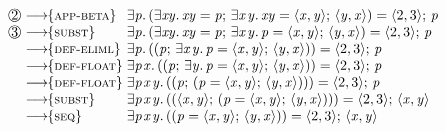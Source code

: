 \documentclass[acmsmall,review,dvipsnames]{acmart}
\newcommand{\Varid}[1]{\mathit{#1}}
\newcommand{\rulename}[1]{\textsc{\small #1}}
\newcommand{\movesto}{\longrightarrow}
\newcommand{\movestoC}[1]{\movesto\!\!\{#1\}}
\newcommand{\movestoR}[1]{\movestoC{\rulename{#1}}}
\begin{document}
\begin{figure}
\begin{scriptsize}
$$\begin{array}{@{}l@{\;}l@{\;}l@{}}
\circlednum{2} & \movestoR{app-beta}       & \ensuremath{\exists\Varid{p}.\,(\exists\Varid{xy}.\,\Varid{xy}\mathrel{=}\Varid{p};\,\exists\Varid{x}\hspace{0.3mm}\Varid{y}.\,\Varid{xy}\mathrel{=}\langle{}\Varid{x},\Varid{y}\rangle;\,\langle{}\Varid{y},\Varid{x}\rangle)\mathrel{=}\langle{}\mathrm{2},\mathrm{3}\rangle;\,\Varid{p}} \\
\circlednum{3} & \movestoR{subst}          & \ensuremath{\exists\Varid{p}.\,(\exists\Varid{xy}.\,\Varid{xy}\mathrel{=}\Varid{p};\,\exists\Varid{x}\hspace{0.3mm}\Varid{y}.\,\Varid{p}\mathrel{=}\langle{}\Varid{x},\Varid{y}\rangle;\,\langle{}\Varid{y},\Varid{x}\rangle)\mathrel{=}\langle{}\mathrm{2},\mathrm{3}\rangle;\,\Varid{p}} \\
               & \movestoR{def-eliml}      & \ensuremath{\exists\Varid{p}.\,((\Varid{p};\,\exists\Varid{x}\hspace{0.3mm}\Varid{y}.\,\Varid{p}\mathrel{=}\langle{}\Varid{x},\Varid{y}\rangle;\,\langle{}\Varid{y},\Varid{x}\rangle))\mathrel{=}\langle{}\mathrm{2},\mathrm{3}\rangle;\,\Varid{p}} \\
               & \movestoR{def-float}      & \ensuremath{\exists\Varid{p}\hspace{0.3mm}\Varid{x}.\,((\Varid{p};\,\exists\Varid{y}.\,\Varid{p}\mathrel{=}\langle{}\Varid{x},\Varid{y}\rangle;\,\langle{}\Varid{y},\Varid{x}\rangle))\mathrel{=}\langle{}\mathrm{2},\mathrm{3}\rangle;\,\Varid{p}} \\
               & \movestoR{def-float}      & \ensuremath{\exists\Varid{p}\hspace{0.3mm}\Varid{x}\hspace{0.3mm}\Varid{y}.\,((\Varid{p};\,(\Varid{p}\mathrel{=}\langle{}\Varid{x},\Varid{y}\rangle;\,\langle{}\Varid{y},\Varid{x}\rangle)))\mathrel{=}\langle{}\mathrm{2},\mathrm{3}\rangle;\,\Varid{p}} \\
               & \movestoR{subst}          & \ensuremath{\exists\Varid{p}\hspace{0.3mm}\Varid{x}\hspace{0.3mm}\Varid{y}.\,((\langle{}\Varid{x},\Varid{y}\rangle;\,(\Varid{p}\mathrel{=}\langle{}\Varid{x},\Varid{y}\rangle;\,\langle{}\Varid{y},\Varid{x}\rangle)))\mathrel{=}\langle{}\mathrm{2},\mathrm{3}\rangle;\,\langle{}\Varid{x},\Varid{y}\rangle} \\
               & \movestoR{seq}            & \ensuremath{\exists\Varid{p}\hspace{0.3mm}\Varid{x}\hspace{0.3mm}\Varid{y}.\,((\Varid{p}\mathrel{=}\langle{}\Varid{x},\Varid{y}\rangle;\,\langle{}\Varid{y},\Varid{x}\rangle))\mathrel{=}\langle{}\mathrm{2},\mathrm{3}\rangle;\,\langle{}\Varid{x},\Varid{y}\rangle} \\

\end{array}$$
\end{scriptsize}
\end{figure}
\end{document}
